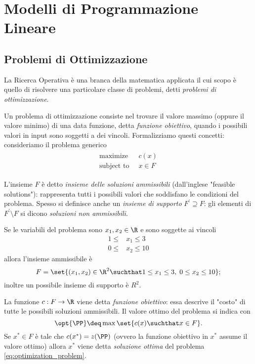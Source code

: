 \chapter{Modelli di Programmazione Lineare}

\section{Problemi di Ottimizzazione}
La Ricerca Operativa è una branca della matematica applicata il cui scopo è quello di risolvere una particolare classe di problemi, detti \emph{problemi di ottimizzazione}.

Un problema di ottimizzazione consiste nel trovare il valore massimo (oppure il valore minimo) di una data funzione, detta \emph{funzione obiettivo}, quando i possibili valori in input sono soggetti a dei vincoli.
Formalizziamo questi concetti: consideriamo il problema generico 
\begin{align}
    \tag{$\PP$} \label{eq:optimization_problem}
    \begin{split} 
        \text{maximize}              &\;\; c(x) \\
        \text{subject to} &\;\; x \in F
    \end{split}
\end{align}

L'insieme $F$ è detto \emph{insieme delle soluzioni ammissibili} (dall'inglese "feasible solutions"): rappresenta tutti i possibili valori che soddisfano le condizioni del problema. 
Spesso si definisce anche un \emph{insieme di supporto} $F^{\prime} \supseteq F$: gli elementi di $F^{\prime} \setminus F$ si dicono \emph{soluzioni non ammissibili}.

\begin{example}
    Se le variabili del problema sono $x_1, x_2 \in \R$ e sono soggette ai vincoli \begin{align*}
        1 \leq {}&{} x_1 \leq 3\\
        0 \leq {}&{} x_2 \leq 10
    \end{align*}
    allora l'insieme ammissibile è \[
        F = \set{(x_1, x_2) \in \R^2 \suchthat 1 \leq x_1 \leq 3,\; 
        0 \leq x_2 \leq 10}; 
    \] inoltre un possibile insieme di supporto è $R^2$.
\end{example}

La funzione $c : F \to \R$ viene detta \emph{funzione obiettivo}: essa descrive il "costo" di tutte le possibili soluzioni ammissibili. Il valore ottimo del problema si indica con \[
    \opt{\PP} \deq \max \set{c(x) \suchthat x \in F}.
\] Se $x^{\ast} \in F$ 
è tale che $c(x^{\ast}) = z(\PP)$
(ovvero la funzione obiettivo in $x^{\ast}$ assume il valore ottimo) allora $x^{\ast}$ viene detta \emph{soluzione ottima} del problema 
\eqref*{eq:optimization_problem}.

